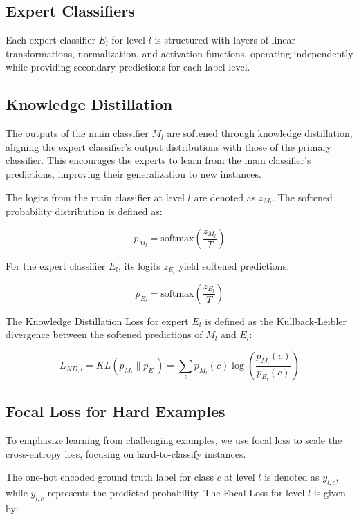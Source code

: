 \documentclass[9pt,a4paper,twoside]{rho-class/rho}
\begin{document}
 \subsection{Expert Classifiers}
    
        Each expert classifier \( E_l \) for level \( l \) is structured with layers of linear transformations, normalization, and activation functions, operating independently while providing secondary predictions for each label level.

 \subsection{Knowledge Distillation}
    
        The outputs of the main classifier \( M_l \) are softened through knowledge distillation, aligning the expert classifier’s output distributions with those of the primary classifier. This encourages the experts to learn from the main classifier’s predictions, improving their generalization to new instances. 

   The logits from the main classifier at level \( l \) are denoted as \( z_{M_l} \). The softened probability distribution is defined as:

   \[
   p_{M_l} = \text{softmax}\left(\frac{z_{M_l}}{T}\right)
   \]

   For the expert classifier \( E_l \), its logits \( z_{E_l} \) yield softened predictions:

   \[
   p_{E_l} = \text{softmax}\left(\frac{z_{E_l}}{T}\right)
   \]

   The Knowledge Distillation Loss for expert \( E_l \) is defined as the Kullback-Leibler divergence between the softened predictions of \( M_l \) and \( E_l \):

   \[
   L_{KD,l} = KL\left(p_{M_l} \| p_{E_l}\right) = \sum_{c} p_{M_l}(c) \log\left(\frac{p_{M_l}(c)}{p_{E_l}(c)}\right)
   \]

 \subsection{Focal Loss for Hard Examples}
    
        To emphasize learning from challenging examples, we use focal loss to scale the cross-entropy loss, focusing on hard-to-classify instances. 

   The one-hot encoded ground truth label for class \( c \) at level \( l \) is denoted as \( y_{l,c} \), while \( \hat{y}_{l,c} \) represents the predicted probability. The Focal Loss for level \( l \) is given by:
\end{document}
